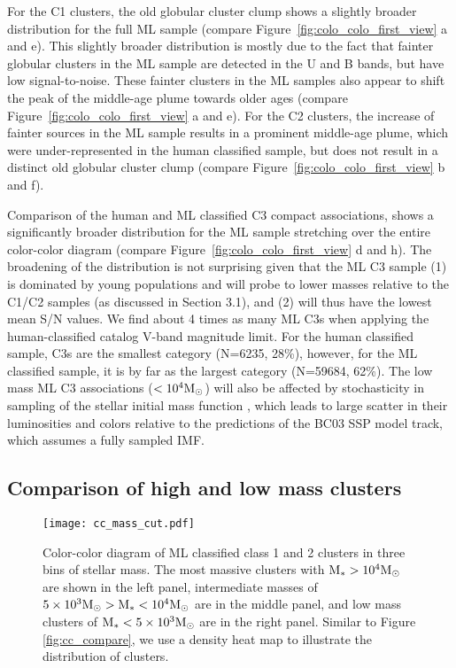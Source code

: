 \documentclass[linenumbers]{aastex63}
\begin{document}
For the C1 clusters, the old globular cluster clump shows a slightly broader distribution for the full ML sample (compare Figure~\ref{fig:colo_colo_first_view} a and e). This slightly broader distribution is mostly due to the fact that fainter globular clusters in the ML sample are detected in the U and B bands, but have low signal-to-noise. These fainter clusters in the ML samples also appear to shift the peak of the middle-age plume towards older ages (compare Figure~\ref{fig:colo_colo_first_view} a and e).   For the C2 clusters, the increase of fainter sources in the ML sample results in a prominent middle-age plume, which were under-represented in the human classified sample, but does not result in a distinct old globular cluster clump (compare Figure~\ref{fig:colo_colo_first_view} b and f).

Comparison of the human and ML classified C3 compact associations, shows a significantly broader distribution for the ML sample stretching over the entire color-color diagram (compare Figure~\ref{fig:colo_colo_first_view} d and h).    The broadening of the distribution is not surprising given that the ML C3 sample (1) is dominated by young populations and will probe to lower masses relative to the C1/C2 samples (as discussed in Section 3.1), and (2) will thus have the lowest mean S/N values.   We find about 4 times as many ML C3s when applying the human-classified catalog V-band magnitude limit. For the human classified sample, C3s are the smallest category (N=6235, 28\%), however, for the ML classified sample, it is by far as the largest category (N=59684, 62\%). The low mass ML C3 associations (${\rm <10^4 M_{\odot} }$) will also be affected by stochasticity in sampling of the stellar initial mass function \citep[e.g.][]{fouesneau_accounting_2010,popescu_age_2012,de_meulenaer_deriving_2013,krumholz_star_2015, OD2022}, which leads to large scatter in their luminosities and colors relative to the predictions of the BC03 SSP model track, which assumes a fully sampled IMF.


\subsection{Comparison of high and low mass clusters}\label{ssect:cc_mag_m_star}
\begin{figure*} 
\texttt{[image: cc\_mass\_cut.pdf]}
 \caption{Color-color diagram of ML classified class 1 and 2 clusters in three bins of stellar mass. The most massive clusters with ${\rm M_{*} > 10^4 M_{\odot}}$ are shown in the left panel, intermediate masses of ${\rm 5\times10^3 M_{\odot} > M_{*} < 10^4 M_{\odot}}$ are in the middle panel, and low mass clusters of ${\rm M_{*} < 5\times10^3 M_{\odot}}$ are in the right panel. Similar to Figure\,\ref{fig:cc_compare}, we use a density heat map to illustrate the distribution of clusters.}
 \label{fig:cc_mass_cut}
\end{figure*}
\end{document}
